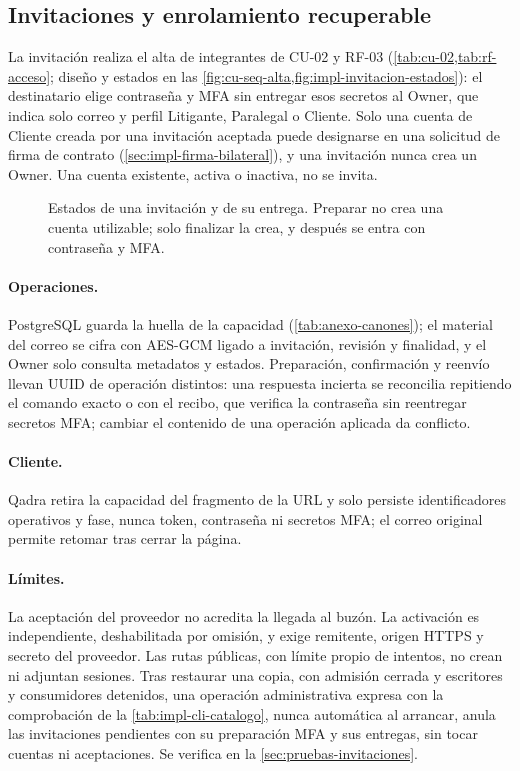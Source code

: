 \subsection{Invitaciones y enrolamiento recuperable}\label{sec:impl-invitaciones}

La invitación realiza el alta de integrantes de CU-02 y RF-03 (\cref{tab:cu-02,tab:rf-acceso}; diseño y estados en las \cref{fig:cu-seq-alta,fig:impl-invitacion-estados}): el destinatario elige contraseña y MFA sin entregar esos secretos al Owner, que indica solo correo y perfil Litigante, Paralegal o Cliente. Solo una cuenta de Cliente creada por una invitación aceptada puede designarse en una solicitud de firma de contrato (\cref{sec:impl-firma-bilateral}), y una invitación nunca crea un Owner. Una cuenta existente, activa o inactiva, no se invita.

\begin{figure}[!htb]
  \centering
  
  \caption{Estados de una invitación y de su entrega. Preparar no crea una cuenta utilizable; solo finalizar la crea, y después se entra con contraseña y MFA.}
  \label{fig:impl-invitacion-estados}
\end{figure}

\paragraph{Operaciones.} PostgreSQL guarda la huella de la capacidad (\cref{tab:anexo-canones}); el material del correo se cifra con AES-GCM ligado a invitación, revisión y finalidad, y el Owner solo consulta metadatos y estados. Preparación, confirmación y reenvío llevan UUID de operación distintos: una respuesta incierta se reconcilia repitiendo el comando exacto o con el recibo, que verifica la contraseña sin reentregar secretos MFA; cambiar el contenido de una operación aplicada da conflicto.

\paragraph{Cliente.} Qadra retira la capacidad del fragmento de la URL y solo persiste identificadores operativos y fase, nunca token, contraseña ni secretos MFA; el correo original permite retomar tras cerrar la página.

\paragraph{Límites.} La aceptación del proveedor no acredita la llegada al buzón. La activación es independiente, deshabilitada por omisión, y exige remitente, origen HTTPS y secreto del proveedor. Las rutas públicas, con límite propio de intentos, no crean ni adjuntan sesiones. Tras restaurar una copia, con admisión cerrada y escritores y consumidores detenidos, una operación administrativa expresa con la comprobación de la \cref{tab:impl-cli-catalogo}, nunca automática al arrancar, anula las invitaciones pendientes con su preparación MFA y sus entregas, sin tocar cuentas ni aceptaciones. Se verifica en la \cref{sec:pruebas-invitaciones}.

